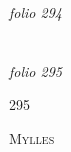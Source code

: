 \documentclass[12pt, a4paper]{book}
\begin{document}
\dotfill
						\newpage
{}

\textit{folio 294}


         \vspace*{4cm}
         
\dotfill
						  \section*{}

\textit{folio 295}



\begin{flushright}{\color{Mahogany}295}\end{flushright}


				\begin{center} \begin{large} {\scshape Mylles} \end{large} \end{center}
			
\end{document}
